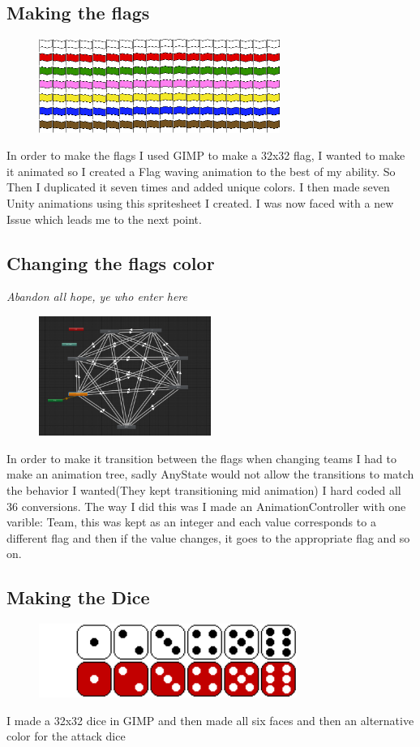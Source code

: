 \documentclass{article}
\begin{document}
	\subsection{Making the flags}
		\begin{figure}[h!]
			\centering
			\includegraphics[width=0.7\textwidth]{flagsheet.png}
		\end{figure}
		In order to make the flags I used GIMP to make a 32x32 flag, I wanted to make it animated so I created a Flag waving animation to the best of my ability. So Then I duplicated it seven times and added unique colors. I then made seven Unity animations using this spritesheet I created. I was now faced with a new Issue which leads me to the next point.
	\subsection{Changing the flags color}
		\textit{Abandon all hope, ye who enter here}\\
		\begin{figure}[h!]
			\centering
			\includegraphics[width=0.5\textwidth]{animationTree.png}
		\end{figure}
		In order to make it transition between the flags when changing teams I had to make an animation tree, sadly AnyState would not allow the transitions to match the behavior I wanted(They kept transitioning mid animation) I hard coded all 36 conversions. The way I did this was I made an AnimationController with one varible: Team, this was kept as an integer and each value corresponds to a different flag and then if the value changes, it goes to the appropriate flag and so on.
	\subsection{Making the Dice}
		\begin{figure}[h!]
			\centering
			\includegraphics[width=0.75\textwidth]{dice.png}
		\end{figure}
		I made a 32x32 dice in GIMP and then made all six faces and then an alternative color for the attack dice
	\newpage
\end{document}
